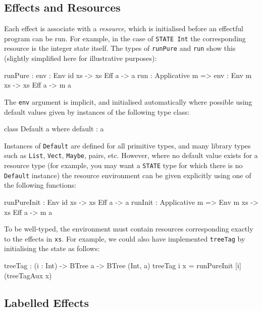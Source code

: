 \subsection{Effects and Resources}

Each effect is associate with a \emph{resource}, which is initialised before
an effectful program can be run. For example, in the case of \texttt{STATE Int}
the corresponding resource is the integer state itself.
The types of \texttt{runPure} and \texttt{run} show this (slightly
simplified here for illustrative purposes):

\begin{code}
runPure : {env : Env id xs} -> { xs } Eff a -> a
run : Applicative m => {env : Env m xs} -> { xs } Eff a -> m a
\end{code}

\noindent
The \texttt{env} argument is implicit, and initialised automatically where
possible using default values given by instances of the following type class:

\begin{code}
class Default a where
    default : a
\end{code}

\noindent
Instances of \texttt{Default} are defined for all primitive types, and many
library types such as \texttt{List}, \texttt{Vect}, \texttt{Maybe}, pairs,
etc. However, where no default value exists for a resource type (for example,
you may want a \texttt{STATE} type for which there is no \texttt{Default}
instance) the resource environment can be given explicitly using one of
the following functions:

\begin{code}
runPureInit : Env id xs -> { xs } Eff a -> a
runInit : Applicative m => Env m xs -> { xs } Eff a -> m a
\end{code}

\noindent
To be well-typed, the environment must contain resources corresponding exactly
to the effects in \texttt{xs}.
For example, we could also have implemented \texttt{treeTag} by initialising
the state as follows:

\begin{code}
treeTag : (i : Int) -> BTree a -> BTree (Int, a)
treeTag i x = runPureInit [i] (treeTagAux x)
\end{code}

\subsection{Labelled Effects}

